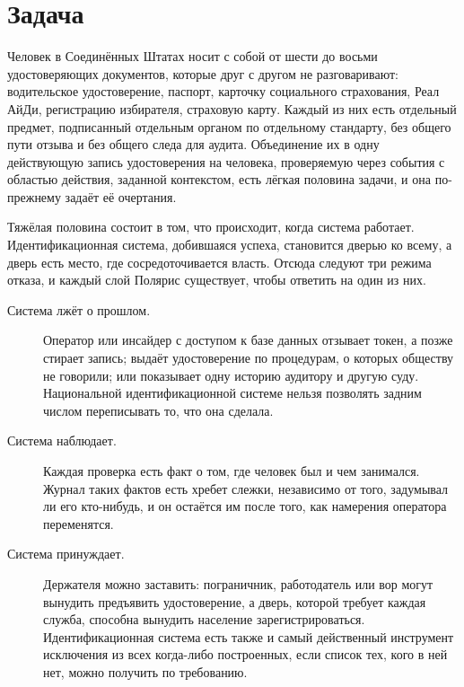 \section{Задача}
\label{sec:problem}

Человек в Соединённых Штатах носит с собой от шести до восьми удостоверяющих документов, которые
друг с другом не разговаривают: водительское удостоверение, паспорт, карточку социального
страхования, Реал АйДи, регистрацию избирателя, страховую карту. Каждый из них есть отдельный
предмет, подписанный отдельным органом по отдельному стандарту, без общего пути отзыва и без
общего следа для аудита. Объединение их в одну действующую запись удостоверения на человека,
проверяемую через события с областью действия, заданной контекстом, есть лёгкая половина задачи, и
она по-прежнему задаёт её очертания.

Тяжёлая половина состоит в том, что происходит, когда система работает. Идентификационная
система, добившаяся успеха, становится дверью ко всему, а дверь есть место, где
сосредоточивается власть. Отсюда следуют три режима отказа, и каждый слой Полярис существует,
чтобы ответить на один из них.

\begin{description}
  \item[Система лжёт о прошлом.] Оператор или инсайдер с доступом к базе данных отзывает токен, а
    позже стирает запись; выдаёт удостоверение по процедурам, о которых обществу не говорили; или
    показывает одну историю аудитору и другую суду. Национальной идентификационной системе нельзя
    позволять задним числом переписывать то, что она сделала.
  \item[Система наблюдает.] Каждая проверка есть факт о том, где человек был и чем занимался.
    Журнал таких фактов есть хребет слежки, независимо от того, задумывал ли его кто-нибудь, и он
    остаётся им после того, как намерения оператора переменятся.
  \item[Система принуждает.] Держателя можно заставить: пограничник, работодатель или вор могут
    вынудить предъявить удостоверение, а дверь, которой требует каждая служба, способна вынудить
    население зарегистрироваться. Идентификационная система есть также и самый действенный
    инструмент исключения из всех когда-либо построенных, если список тех, кого в ней нет, можно
    получить по требованию.
\end{description}

